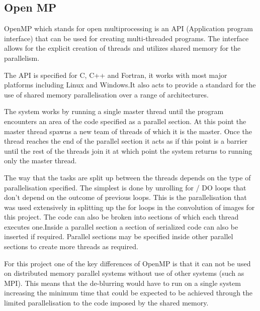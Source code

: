 \subsection{Open MP}
OpenMP which stands for open multiprocessing is an API (Application program interface) that can be used for creating multi-threaded programs. The interface allows for the explicit creation of threads and utilizes shared memory for the parallelism.

The API is specified for C, C++ and Fortran, it works with most major platforms including Linux and Windows.It also acts to provide a standard for the use of shared memory parallelisation over a range of architectures.

The system works by running a single master thread until the program encounters an area of the code specified as a parallel section. At this point the master thread spawns a new team of threads of which it is the master. Once the thread reaches the end of the parallel section it acts as if this point is a barrier until the rest of the threads join it at which point the system returns to running only the master thread. 

The way that the tasks are split up between the threads depends on the type of parallelisation specified. The simplest is done by unrolling for / DO loops that don’t depend on the outcome of previous loops. This is the parallelisation that was used extensively in splitting up the for loops in the convolution of images for this project. The code can also be broken into sections of which each thread executes one.Inside a parallel section a section of serialized code can also be inserted if required. Parallel sections may be specified inside other parallel sections to create more threads as required.

For this project one of the key differences of OpenMP is that it can not be used on distributed memory parallel systems without use of other systems (such as MPI). This means that the de-blurring would have to run on a single system increasing the minimum time that could be expected to be achieved through the limited parallelisation to the code imposed by the shared memory.
